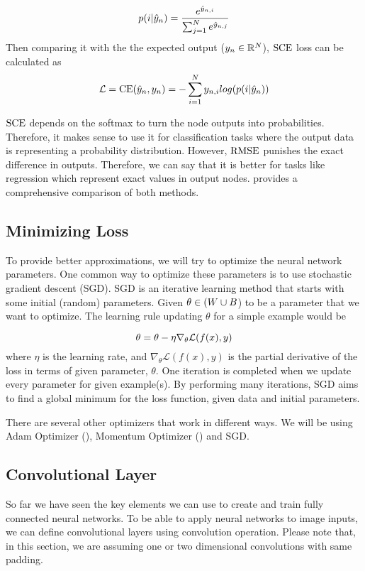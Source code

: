 $$p(i | \hat{y}_{n}) = \frac{e^{\hat{y}_{n,i}}}{\sum_{j=1}^{N}e^{\hat{y}_{n,j}}}$$
Then comparing it with the the expected output ($y_{n} \in \mathbb{R}^{N}$), $\textrm{SCE}$ loss can be calculated as
$$\mathcal{L} = \textrm{CE}(\hat{y}_{n}, y_{n}) = - \sum_{i=1}^{N} y_{n,i} log(p(i | \hat{y}_{n}))$$

$\textrm{SCE}$ depends on the softmax to turn the node outputs into probabilities. Therefore, it makes sense to use it for classification tasks where the output data is representing a probability distribution. However, $\textrm{RMSE}$ punishes the exact difference in outputs. Therefore, we can say that it is better for tasks like regression which represent exact values in output nodes. \cite{golik2013cross} provides a comprehensive comparison of both methods. 

\subsection{Minimizing Loss}
To provide better approximations, we will try to optimize the neural network parameters. One common way to optimize these parameters is to use stochastic gradient descent (SGD). SGD is an iterative learning method that starts with some initial (random) parameters. Given $\theta \in (\all\weights \cup \all\biasterm$) to be a parameter that we want to optimize. The learning rule updating $\theta$ for a simple example would be

$$ \theta = \theta- \eta \nabla_\theta{\mathcal{L}(f(x),y)} $$
where $\eta$ is the learning rate, and $\nabla_\theta{\mathcal{L}(f(x), y)}$ is the partial derivative of the loss in terms of given parameter, $\theta$. One iteration is completed when we update every parameter for given example(s). By performing many iterations, SGD aims to find a global minimum for the loss function, given data and initial parameters.

There are several other optimizers that work in different ways. We will be using Adam Optimizer (\cite{kingma2014adam}), Momentum Optimizer (\cite{qian1999momentum}) and SGD.

\subsection{Convolutional Layer}
So far we have seen the key elements we can use to create and train fully connected neural networks. To be able to apply neural networks to image inputs, we can define convolutional layers using convolution operation. Please note that, in this section, we are assuming one or two dimensional convolutions with same padding. 

